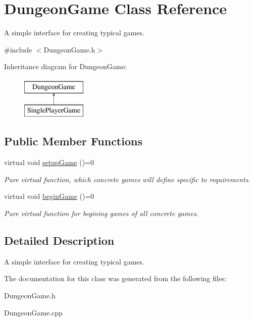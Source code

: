 \hypertarget{class_dungeon_game}{}\section{Dungeon\+Game Class Reference}
\label{class_dungeon_game}


A simple interface for creating typical games.  




{\ttfamily \#include $<$Dungeon\+Game.\+h$>$}

Inheritance diagram for Dungeon\+Game\+:\begin{figure}[H]
\begin{center}
\leavevmode
\includegraphics[height=2.000000cm]{class_dungeon_game}
\end{center}
\end{figure}
\subsection*{Public Member Functions}
\begin{DoxyCompactItemize}
\item 
\hypertarget{class_dungeon_game_af54f64c74c8c6d79f37ae77431c4e626}{}virtual void \hyperlink{class_dungeon_game_af54f64c74c8c6d79f37ae77431c4e626}{setup\+Game} ()=0\label{class_dungeon_game_af54f64c74c8c6d79f37ae77431c4e626}

\begin{DoxyCompactList}\small\item\em Pure virtual function, which concrete games will define specific to requirements. \end{DoxyCompactList}\item 
\hypertarget{class_dungeon_game_a76811f2d4100bab2feaa389ea9c385e2}{}virtual void \hyperlink{class_dungeon_game_a76811f2d4100bab2feaa389ea9c385e2}{begin\+Game} ()=0\label{class_dungeon_game_a76811f2d4100bab2feaa389ea9c385e2}

\begin{DoxyCompactList}\small\item\em Pure virtual function for begining games of all concrete games. \end{DoxyCompactList}\end{DoxyCompactItemize}


\subsection{Detailed Description}
A simple interface for creating typical games. 

The documentation for this class was generated from the following files\+:\begin{DoxyCompactItemize}
\item 
Dungeon\+Game.\+h\item 
Dungeon\+Game.\+cpp\end{DoxyCompactItemize}

